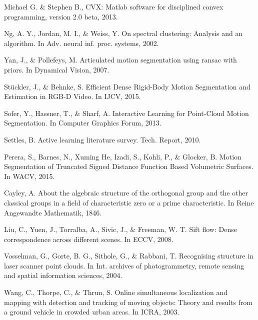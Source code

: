\documentclass[10pt,twocolumn,letterpaper]{article}  %
\begin{document}
\begin{thebibliography}{99}

 Michael G. \& Stephen B., CVX: Matlab software for disciplined convex programming, version 2.0 beta, 2013.

 Ng, A. Y., Jordan, M. I., \& Weiss, Y. On spectral clustering: Analysis and an algorithm. In Adv. neural inf. proc. systems, 2002.


 Yan, J., \& Pollefeys, M. Articulated motion segmentation using ransac with priors. In Dynamical Vision, 2007.
%

Stückler, J., \& Behnke, S. Efficient Dense Rigid-Body Motion Segmentation and Estimation in RGB-D Video. In IJCV, 2015.

 Sofer, Y., Hassner, T., \& Sharf, A. Interactive Learning for Point‐Cloud Motion Segmentation. In Computer Graphics Forum, 2013.

 Settles, B. Active learning literature survey. Tech. Report, 2010.

 Perera, S., Barnes, N., Xuming He, Izadi, S., Kohli, P., \& Glocker, B. Motion Segmentation of Truncated Signed Distance Function Based Volumetric Surfaces. In WACV, 2015.
%

 Cayley, A. About the algebraic structure of the orthogonal group and the other classical groups in a field of characteristic zero or a prime characteristic. In Reine Angewandte Mathematik, 1846.

Liu, C., Yuen, J., Torralba, A., Sivic, J., \& Freeman, W. T. Sift flow: Dense correspondence across different scenes. In ECCV, 2008.

 Vosselman, G., Gorte, B. G., Sithole, G., \& Rabbani, T. Recognising structure in laser scanner point clouds. In Int. archives of photogrammetry, remote sensing and spatial information sciences, 2004.

Wang, C., Thorpe, C., \& Thrun, S. Online simultaneous localization and mapping with detection and tracking of moving objects: Theory and results from a ground vehicle in crowded urban areas. In ICRA, 2003.


\end{thebibliography}
\end{document}
